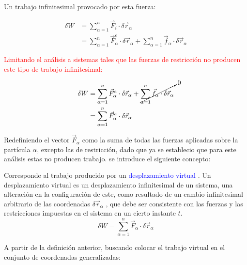 \documentclass[/home/hernan-barquero/Documents/Apuntes_mecanica_teorica/main.tex]{subfiles}
\begin{document}
    Un trabajo infinitesimal provocado por esta fuerza:

    \begin{align*}
        \delta W &= \sum_{\alpha=1}^{n} \vec{F}_{i}  \cdot \delta \vec{r}_{\alpha} \\ 
                &= \sum_{\alpha=1}^{n} \vec{F}_{\alpha} ^{e}  \cdot \delta \vec{r}_{\alpha} + \sum_{\alpha=1}^{n} \vec{f}_{\alpha}  \cdot \delta \vec{r}_{\alpha}
    \end{align*}

    \textcolor{red}{Limitando el análisis a sistemas tales que las fuerzas de restricción no producen este tipo de trabajo infinitesimal:} 

    \begin{align*}
        \delta W &= \sum_{\alpha=1}^{n} \vec{F}_{\alpha} ^{e} \cdot \delta \vec{r}_{\alpha} + \cancelto{0}{\sum_{\alpha=1}^{n} \vec{f}_{\alpha}  \cdot \delta \vec{r}_{\alpha}} \\ 
            & = \sum_{\alpha=1}^{n} \vec{F}_{\alpha} ^{e} \cdot \delta \vec{r}_{\alpha}
    \end{align*}

    Redefiniendo el vector $\vec{F}_{\alpha}$ como la suma de todas las fuerzas aplicadas sobre la partícula $\alpha$, excepto las de restricción, dado que ya se establecio que para este análisis estas no producen trabajo. se introduce el siguiente concepto:


    \begin{definition} 
        Corresponde al trabajo producido por un \textcolor{blue}{desplazamiento virtual }. Un desplazamiento virtual es un desplazamiento infinitesimal de un sistema, una alteración en la configuración de este, como resultado de un cambio infinitesimal arbitrario de las coordenadas $\delta \vec{r}_{\alpha}$ , que debe ser consistente con las fuerzas y las restricciones impuestas en el sistema en un cierto instante $t$. \\ 

        \begin{equation}
            \delta W = \sum_{\alpha=1}^{n} \vec{F}_{\alpha}  \cdot \delta \vec{r}_{\alpha}
            \label{eq: trabajovirtual}
        \end{equation}
    \end{definition}

    A partir de la definición anterior, buscando colocar el trabajo virtual en el conjunto de coordenadas generalizadas:\\ 
\end{document}
